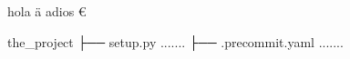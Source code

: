 \documentclass{article}
\begin{document}
hola \texteuro \"a adios €

the\_project
├── setup.py .......
├── .precommit.yaml .......
\end{document}
